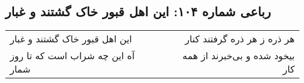 \begin{center}
\section*{رباعی شماره ۱۰۴: این اهل قبور خاک گشتند و غبار}
\label{sec:sh104}
\begin{longtable}{l p{0.5cm} r}
این اهل قبور خاک گشتند و غبار
&&
هر ذره ز هر ذره گرفتند کنار
\\
آه این چه شراب است که تا روز شمار
&&
بیخود شده و بی‌خبرند از همه کار
\\
\end{longtable}
\end{center}
